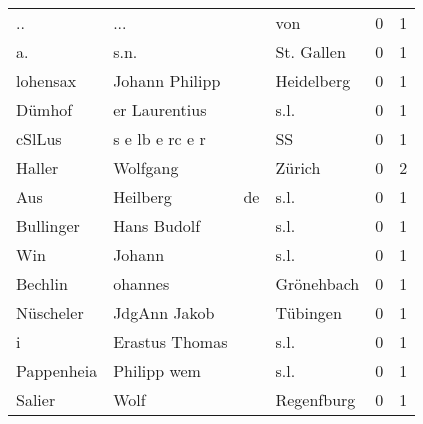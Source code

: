 \begin{center}
\begin{tiny}
\begin{longtabu}{llllrr}
                       .. &                                ... &             &                                         von &          0 &         1 \\
                       a. &                               s.n. &             &                                  St. Gallen &          0 &         1 \\
                 lohensax &                     Johann Philipp &             &                                  Heidelberg &          0 &         1 \\
                   Dümhof &                      er Laurentius &             &                                        s.l. &          0 &         1 \\
                   cSlLus &                    s e lb e rc e r &             &                                          SS &          0 &         1 \\
                   Haller &                           Wolfgang &             &                                      Zürich &          0 &         2 \\
                      Aus &                           Heilberg &          de &                                        s.l. &          0 &         1 \\
                Bullinger &                        Hans Budolf &             &                                        s.l. &          0 &         1 \\
                      Win &                             Johann &             &                                        s.l. &          0 &         1 \\
                  Bechlin &                            ohannes &             &                                  Grönehbach &          0 &         1 \\
                Nüscheler &                       JdgAnn Jakob &             &                                    Tübingen &          0 &         1 \\
                        i &                     Erastus Thomas &             &                                        s.l. &          0 &         1 \\
               Pappenheia &                        Philipp wem &             &                                        s.l. &          0 &         1 \\
                   Salier &                               Wolf &             &                                  Regenfburg &          0 &         1 \\

\end{longtabu}
\end{tiny}
\end{center}
